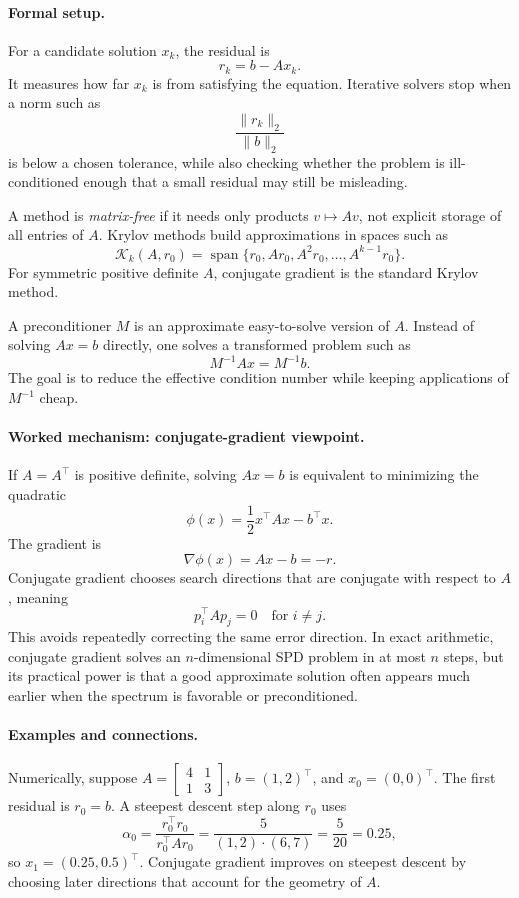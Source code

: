 \paragraph{Formal setup.}
For a candidate solution \(x_k\), the residual is
\[
r_k=b-Ax_k.
\]
It measures how far \(x_k\) is from satisfying the equation. Iterative solvers stop when a norm such as
\[
\frac{\|r_k\|_2}{\|b\|_2}
\]
is below a chosen tolerance, while also checking whether the problem is ill-conditioned enough that a small residual may still be misleading.

A method is \emph{matrix-free} if it needs only products \(v\mapsto Av\), not explicit storage of all entries of \(A\). Krylov methods build approximations in spaces such as
\[
\mathcal{K}_k(A,r_0)=
\operatorname{span}\{r_0,Ar_0,A^2r_0,\ldots,A^{k-1}r_0\}.
\]
For symmetric positive definite \(A\), conjugate gradient is the standard Krylov method.

A preconditioner \(M\) is an approximate easy-to-solve version of \(A\). Instead of solving \(Ax=b\) directly, one solves a transformed problem such as
\[
M^{-1}Ax=M^{-1}b.
\]
The goal is to reduce the effective condition number while keeping applications of \(M^{-1}\) cheap.

\paragraph{Worked mechanism: conjugate-gradient viewpoint.}
If \(A=A^\top\) is positive definite, solving \(Ax=b\) is equivalent to minimizing the quadratic
\[
\phi(x)=\frac12x^\top Ax-b^\top x.
\]
The gradient is
\[
\nabla\phi(x)=Ax-b=-r.
\]
Conjugate gradient chooses search directions that are conjugate with respect to \(A\), meaning
\[
p_i^\top A p_j=0\quad\text{for }i\neq j.
\]
This avoids repeatedly correcting the same error direction. In exact arithmetic, conjugate gradient solves an \(n\)-dimensional SPD problem in at most \(n\) steps, but its practical power is that a good approximate solution often appears much earlier when the spectrum is favorable or preconditioned.

\paragraph{Examples and connections.}
Numerically, suppose \(A=\begin{bmatrix}4&1\\1&3\end{bmatrix}\), \(b=(1,2)^\top\), and \(x_0=(0,0)^\top\). The first residual is \(r_0=b\). A steepest descent step along \(r_0\) uses
\[
\alpha_0=\frac{r_0^\top r_0}{r_0^\top A r_0}
=\frac{5}{(1,2)\cdot(6,7)}
=\frac{5}{20}
=0.25,
\]
so \(x_1=(0.25,0.5)^\top\). Conjugate gradient improves on steepest descent by choosing later directions that account for the geometry of \(A\).

